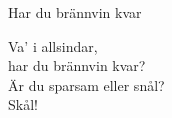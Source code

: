 \begin{song}{Har du brännvin kvar}

	
	Va' i allsindar,\\
	har du brännvin kvar?\\
	Är du sparsam eller snål?\\
	Skål!
	
\end{song}
